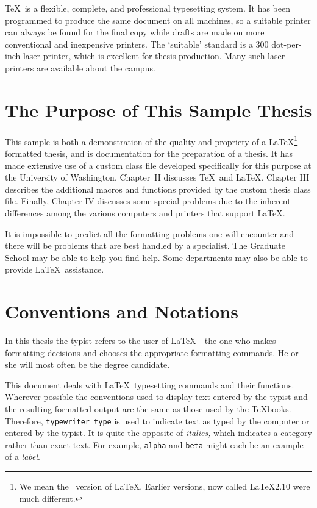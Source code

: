 \documentclass [11pt, twoside] {uwthesis}[2012/02/03]
\begin{document}
 
\TeX\ is a flexible,
complete, and professional typesetting system.
It has been programmed to produce
the same document on all machines, so
a suitable printer can always be found for the final copy
while drafts are made on more conventional and inexpensive printers.
The `suitable' standard is a 300 dot-per-inch laser printer,
which is excellent for thesis production.  Many such laser printers
are available about the campus.
 
\section{The Purpose of This Sample Thesis}
 
This sample is both a demonstration of the quality and
propriety of a \LaTeX\footnote{We mean the \LaTeXe\ version
of \LaTeX.  Earlier versions, now called \LaTeX2.10 were much
different.} formatted thesis, and is 
documentation for the preparation of a thesis.
It has made extensive use of a custom class file
developed specifically for this purpose
at the University of Washington.  Chapter~II discusses
\TeX\ and \LaTeX.
Chapter III describes the additional macros and functions
provided by the custom thesis class file.  Finally, Chapter IV discusses
some special problems due to the inherent differences among the various
computers and printers that support \LaTeX.
 
It is 
impossible to predict all the formatting problems one will encounter
and there will be problems that are best handled
by a specialist.  
The Graduate School may be able to help you find help.
Some departments may also be able to provide \LaTeX\ assistance.
 
 
\section{Conventions and Notations}
 
In this thesis the typist
refers to the user of \LaTeX---the one who
makes formatting decisions and chooses the appropriate
formatting commands.
He or she will most often be the degree candidate.
 
This document deals with \LaTeX\ typesetting commands and their
functions.  Wherever possible the conventions used to display
text entered by the typist and the resulting formatted output
are the same as those used by the \TeX books.
Therefore, {\tt typewriter type} is used to indicate text
as typed by the computer
or entered by the typist.
It is quite the opposite of {\it italics,} which indicates
a category rather than exact text.  For example,
{\tt alpha} and {\tt beta} might each be an example of a {\it label}.
 
\end{document}
